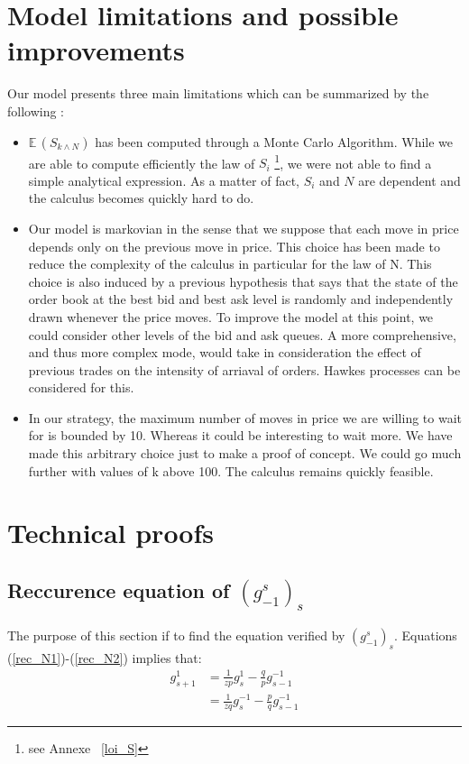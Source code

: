 \documentclass{article}
\newcommand{\g}[2]{g_{#1}^{#2}}
\newcommand{\Min}[2]{ {#1} \wedge {#2} }
\begin{document}
\section{Model limitations and possible improvements}
Our model presents three main limitations which can be summarized by the following :
\begin{itemize}
\item  $\mathbb{E} \, \left( S_{\Min k N} \right) $ has been computed through a Monte Carlo Algorithm. While we are able to compute efficiently the law of $S_i$ \footnote{see Annexe ~\ref{loi_S}}, we were not able to find a simple analytical expression. As a matter of fact, $S_i$ and $N$ are dependent and the calculus becomes quickly hard to do.
\item Our model is markovian in the sense that we suppose that each move in price depends only on the previous move in price. This choice has been made to reduce the complexity of the calculus in particular for the law of N. This choice is also induced by a previous hypothesis that says that the state of the order book at the best bid and best ask level is randomly and independently drawn whenever the price moves. To improve the model at this point, we could consider other levels of the bid and ask queues. A more comprehensive, and thus more complex mode, would take in consideration the effect of previous trades on the intensity of arriaval of orders. Hawkes processes can be considered for this.
\item In our strategy, the maximum number of moves in price we are willing to wait for is bounded by 10. Whereas it could be interesting to wait more. We have made this arbitrary choice just to make a proof of concept. We could go much further with  values of k above 100. The calculus remains quickly feasible.
\end{itemize}

\newpage
\appendix


\section{  Technical proofs}

\subsection{ Reccurence equation of $(\g{-1}{s})_s$ }
The purpose of this section if to find the equation verified by $(\g{-1}{s})_s$.
Equations (\ref{rec_N1})-(\ref{rec_N2}) implies that:
\begin{align*}
		\g{s+1}{1} &= \frac{1}{z p} \g{s}{1} - \frac{q}{p} \g{s-1}{-1} \\
&= \frac{1}{ zq} \g{s}{-1} - \frac{p}{q} \g{s-1}{-1}
\end{align*}
\end{document}
